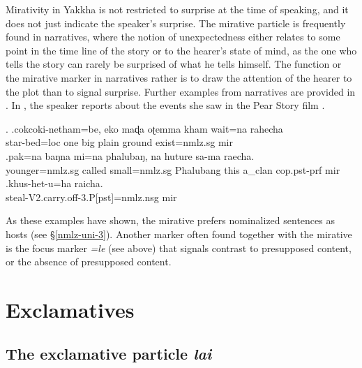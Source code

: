 
Mirativity in Yakkha is not restricted to surprise at the time of speaking, and it does not just indicate the speaker's surprise. The mirative particle is frequently found in narratives, where the notion of unexpectedness either relates to some point in the time line of the story or to the hearer's state of mind, as the one who tells the story can rarely be surprised of what he tells himself. The function or the mirative marker in narratives rather is to draw the attention of the hearer to the plot than to signal surprise.  Further examples from narratives are provided in \Next. In \Next[c], the speaker reports about  the events she saw in the Pear Story film \citep{Chafe1980The-Pear}. 
 
 
 \ex. \ag.cokcoki-netham=be,       eko maɖa oʈemma kham  wait=na        rahecha\\
 star-bed{\sc =loc} one big plain ground exist{\sc [3sg;npst]=nmlz.sg} {\sc mir}\\
 \bg.pak=na  baŋna mi=na  phalubaŋ, na   huture    sa-ma      raecha.\\
 younger{\sc =nmlz.sg} called small{\sc =nmlz.sg} Phalubang this a\_clan {\sc cop.pst-prf} {\sc mir}\\
 \bg.khus-het-u=ha  raicha.\\
	steal{\sc -V2.carry.off-3.P[pst]=nmlz.nsg} {\sc mir}\\
 
 As these  examples have shown, the mirative prefers nominalized sentences as hosts (see §\ref{nmlz-uni-3}). Another marker often found together with the mirative is the focus marker \emph{=le} (see above) that signals contrast to presupposed content, or the absence of presupposed content.

 
\section{Exclamatives}\label{ptcl-excla}

\subsection{The exclamative particle \emph{lai}}
 
